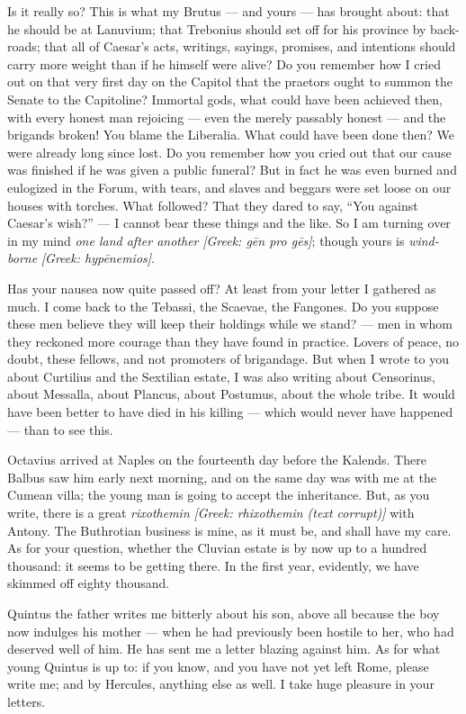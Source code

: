 

 Is it really so? This is what my Brutus --- and yours --- has brought about: that he should be at Lanuvium; that Trebonius should set off for his province by back-roads; that all of Caesar's acts, writings, sayings, promises, and intentions should carry more weight than if he himself were alive? Do you remember how I cried out on that very first day on the Capitol that the praetors ought to summon the Senate to the Capitoline? Immortal gods, what could have been achieved then, with every honest man rejoicing --- even the merely passably honest --- and the brigands broken! You blame the Liberalia. What could have been done then? We were already long since lost. Do you remember how you cried out that our cause was finished if he was given a public funeral? But in fact he was even burned and eulogized in the Forum, with tears, and slaves and beggars were set loose on our houses with torches. What followed? That they dared to say, ``You against Caesar's wish?'' --- I cannot bear these things and the like. So I am turning over in my mind \textit{one land after another} \textit{[Greek: g\=en pro g\=es]}; though yours is \textit{wind-borne} \textit{[Greek: hyp\=enemios]}.

 Has your nausea now quite passed off? At least from your letter I gathered as much. I come back to the Tebassi, the Scaevae, the Fangones. Do you suppose these men believe they will keep their holdings while we stand? --- men in whom they reckoned more courage than they have found in practice. Lovers of peace, no doubt, these fellows, and not promoters of brigandage. But when I wrote to you about Curtilius and the Sextilian estate, I was also writing about Censorinus, about Messalla, about Plancus, about Postumus, about the whole tribe. It would have been better to have died in his killing --- which would never have happened --- than to see this.

 Octavius arrived at Naples on the fourteenth day before the Kalends. There Balbus saw him early next morning, and on the same day was with me at the Cumean villa; the young man is going to accept the inheritance. But, as you write, there is a great \textit{rixothemin} \textit{[Greek: rhixothemin (text corrupt)]} with Antony. The Buthrotian business is mine, as it must be, and shall have my care. As for your question, whether the Cluvian estate is by now up to a hundred thousand: it seems to be getting there. In the first year, evidently, we have skimmed off eighty thousand.

 Quintus the father writes me bitterly about his son, above all because the boy now indulges his mother --- when he had previously been hostile to her, who had deserved well of him. He has sent me a letter blazing against him. As for what young Quintus is up to: if you know, and you have not yet left Rome, please write me; and by Hercules, anything else as well. I take huge pleasure in your letters.
